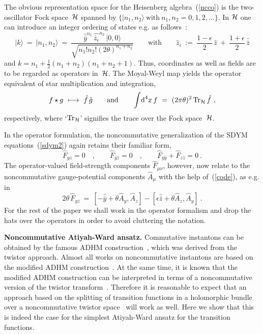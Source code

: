 \documentclass[a4paper,11pt]{article}
\numberwithin{equation}{section}
\def\eps{\epsilon}
\def\th{\theta}
\newcommand{\Hcal}{{\cal H}}
\def\diff{\mbox{d}}
\def\sfrac#1#2{{\textstyle\frac{#1}{#2}}}
\newcommand{\fh}{\hat{f}}
\newcommand{\gh}{\hat{g}}
\def\>{\rangle}
\begin{document}
The obvious representation space for the Heisenberg algebra~(\ref{ncco})
is the two-oscillator Fock space~$\Hcal$ spanned by 
$\{ |n_1,n_2\>\ \textrm{with}\ n_1,n_2=0,1,2,\ldots\}$.
In $\Hcal$ one can introduce an integer ordering of states e.g. 
as follows~\cite{Rangamani:2001cn}:
\begin{equation} \label{fock}
|k\>\ =\ |n_1,n_2\> \ =\
\frac{\hat{\bar y}^{n_1}\,\hat{\bar z_\eps}^{n_2}\,|0,0\>}
{\sqrt{n_1!n_2!(2\th)^{n_1+n_2}}}
\qquad\textrm{with}\qquad
\hat{z}_\eps\ :=\ 
\sfrac{1-\eps}{2}\,\hat{z}\ +\ \sfrac{1+\eps}{2}\,\hat{\bar{z}}
\end{equation}
and $k=n_1+\sfrac{1}{2}(n_1+n_2)(n_1+n_2+1)$.
Thus, coordinates as well as fields are to be regarded as 
operators in~$\Hcal$. The Moyal-Weyl map yields the operator equivalent 
of star multiplication and integration,
\begin{equation} \label{trace}
f\star g\ \longmapsto\ \fh\,\gh \qquad\textrm{and}\qquad
\int\! \diff^4{x}\,f\ =\
(2\pi \theta)^2 \,\mbox{Tr}_\Hcal\, \fh\ ,
\end{equation} 
respectively, where `$\mbox{Tr}_\Hcal$' signifies the trace 
over the Fock space~$\Hcal$.

In the operator formulation,
the noncommutative generalization of the SDYM equations~(\ref{sdym2})
again retains their familiar form,
\begin{equation}\label{sdym3}
\hat{F}_{yz}=0\quad ,\qquad \hat{F}_{\bar y\bar z}=0\quad ,\qquad  
\hat{F}_{ y\bar y}+\hat{F}_{z\bar z}=0\ .
\end{equation}
The operator-valued field-strength components $\hat{F}_{\mu\nu}$, however, 
now relate to the noncommutative gauge-potential components $\hat{A}_\mu$ 
with the help of~(\ref{code}), as e.g. in
\begin{equation}
2\th\,\hat{F}_{yz}\ =\ 
[-\hat{\bar{y}}+\th\hat{A}_y,\hat{A}_z] -
[\eps\hat{\bar{z}}+\th\hat{A}_z,\hat{A}_y] \ .
\end{equation}
{}For the rest of the paper we shall work in the operator formalism and 
drop the hats over the operators in order to avoid cluttering the notation.

\noindent
{\bf Noncommutative Atiyah-Ward ansatz.} 
Commutative instantons can be obtained by the famous 
ADHM construction~\cite{Atiyah:1978ri},
which was derived from the twistor approach.
Almost all works on noncommutative instantons are based on the
modified ADHM construction~\cite{Nekrasov:1998ss}.
At the same time,
it is known that the modified ADHM construction can be interpreted 
in terms of a noncommutative version of the twistor 
transform~\cite{Kapustin:2001ek,Takasaki:2001vs}.
Therefore it is reasonable to expect that an approach based on 
the splitting of transition functions in a 
holomorphic bundle over a noncommutative twistor 
space~\cite{Kapustin:2001ek,Takasaki:2001vs,Hannabuss:2001xj} will 
work as well. Here we show that this is indeed the case 
for the simplest Atiyah-Ward ansatz for the transition functions. 
\end{document}
